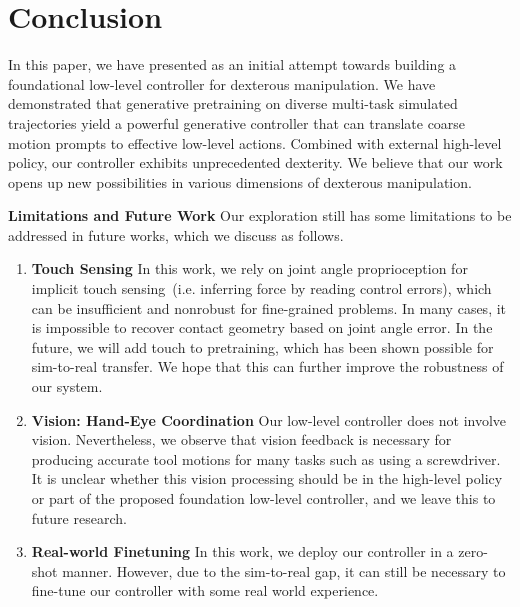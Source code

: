 \section{Conclusion}
In this paper, we have presented \mnamefull{} as an initial attempt towards building a foundational low-level controller for dexterous manipulation. We have demonstrated that generative pretraining on diverse multi-task simulated trajectories yield a powerful generative controller that can translate coarse motion prompts to effective low-level actions. Combined with external high-level policy, our controller exhibits unprecedented dexterity. We believe that our work opens up new possibilities in various dimensions of dexterous manipulation. 

\textbf{Limitations and Future Work} Our exploration still has some limitations to be addressed in future works, which we discuss as follows.
\begin{enumerate}
    \item \textbf{Touch Sensing} In this work, we rely on joint angle proprioception for implicit touch sensing~(i.e. inferring force by reading control errors), which can be insufficient and nonrobust for fine-grained problems. In many cases, it is impossible to recover contact geometry based on joint angle error. In the future, we will add touch to pretraining, which has been shown possible for sim-to-real transfer. We hope that this can further improve the robustness of our system. 
    \item \textbf{Vision: Hand-Eye Coordination} Our low-level controller does not involve vision. Nevertheless, we observe that vision feedback is necessary for producing accurate tool motions for many tasks such as using a screwdriver. It is unclear whether this vision processing should be in the high-level policy or part of the proposed foundation low-level controller, and we leave this to future research.
     \item \textbf{Real-world Finetuning} In this work, we deploy our controller in a zero-shot manner. However, due to the sim-to-real gap, it can still be necessary to fine-tune our controller with some real world experience. 
     

\end{enumerate}



